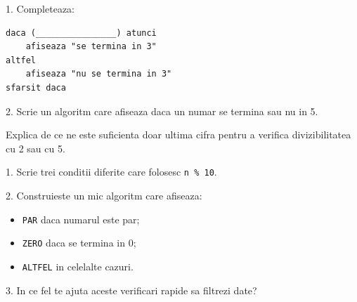 \newpage
{}

\begin{solobox}[Aplicatii]
  1. Completeaza:
\begin{lstlisting}[style=codequest]
daca (________________) atunci
    afiseaza "se termina in 3"
altfel
    afiseaza "nu se termina in 3"
sfarsit daca
\end{lstlisting}

  2. Scrie un algoritm care afiseaza daca un numar se termina sau nu in 5.
\end{solobox}

\begin{solobox}
  Explica de ce ne este suficienta doar ultima cifra pentru a verifica divizibilitatea cu 2 sau cu 5.
\end{solobox}

\newpage
{}

\begin{solobox}
  1. Scrie trei conditii diferite care folosesc \texttt{n \% 10}.

  2. Construieste un mic algoritm care afiseaza:
  \begin{itemize}
    \item \texttt{PAR} daca numarul este par;
    \item \texttt{ZERO} daca se termina in 0;
    \item \texttt{ALTFEL} in celelalte cazuri.
  \end{itemize}

  3. In ce fel te ajuta aceste verificari rapide sa filtrezi date?
\end{solobox}
